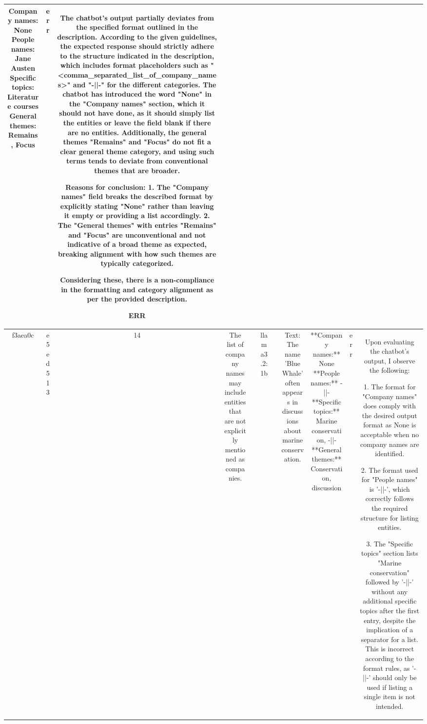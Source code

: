 \begin{table}[h!]
\begin{tabular}{|c|c|c|c|c|c|c|c|c|c|c|}
Company names: None
People names: Jane Austen
Specific topics: Literature courses
General themes: Remains, Focus & err & The chatbot's output partially deviates from the specified format outlined in the description. According to the given guidelines, the expected response should strictly adhere to the structure indicated in the description, which includes format placeholders such as "<comma_separated_list_of_company_names>" and "-||-" for the different categories. The chatbot has introduced the word "None" in the "Company names" section, which it should not have done, as it should simply list the entities or leave the field blank if there are no entities. Additionally, the general themes "Remains" and "Focus" do not fit a clear general theme category, and using such terms tends to deviate from conventional themes that are broader.

Reasons for conclusion:
1. The "Company names" field breaks the described format by explicitly stating "None" rather than leaving it empty or providing a list accordingly.
2. The "General themes" with entries "Remains" and "Focus" are unconventional and not indicative of a broad theme as expected, breaking alignment with how such themes are typically categorized.

Considering these, there is a non-compliance in the formatting and category alignment as per the provided description.

ERR\\
\hline
f3aea0c & e5ed513 & 14 & The list of company names may include entities that are not explicitly mentioned as companies. &  & llama3.2:1b &  & Text: The name 'Blue Whale' often appears in discussions about marine conservation. & **Company names:** None
**People names:** -||-
**Specific topics:** Marine conservation, -||-
**General themes:** Conservation, discussion & err & Upon evaluating the chatbot's output, I observe the following:

1. The format for "Company names" does comply with the desired output format as None is acceptable when no company names are identified.

2. The format used for "People names" is '-||-', which correctly follows the required structure for listing entities.

3. The "Specific topics" section lists "Marine conservation" followed by '-||-' without any additional specific topics after the first entry, despite the implication of a separator for a list. This is incorrect according to the format rules, as '-||-' should only be used if listing a single item is not intended. 


\end{tabular}
\end{table}
